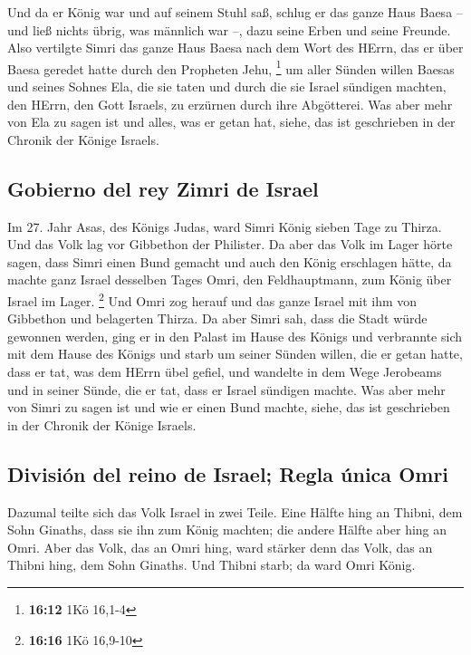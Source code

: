  Und da er König war und auf seinem Stuhl saß, schlug er
das ganze Haus Baesa -- und ließ nichts übrig, was männlich war --, dazu
seine Erben und seine Freunde.  Also vertilgte Simri das
ganze Haus Baesa nach dem Wort des HErrn, das er über Baesa geredet
hatte durch den Propheten Jehu, \footnote{\textbf{16:12} 1Kö 16,1-4}
 um aller Sünden willen Baesas und seines Sohnes Ela, die
sie taten und durch die sie Israel sündigen machten, den HErrn, den Gott
Israels, zu erzürnen durch ihre Abgötterei.  Was aber
mehr von Ela zu sagen ist und alles, was er getan hat, siehe, das ist
geschrieben in der Chronik der Könige Israels.

\hypertarget{gobierno-del-rey-zimri-de-israel}{%
\subsection{Gobierno del rey Zimri de
Israel}\label{gobierno-del-rey-zimri-de-israel}}

 Im 27. Jahr Asas, des Königs Judas, ward Simri König
sieben Tage zu Thirza. Und das Volk lag vor Gibbethon der Philister.
 Da aber das Volk im Lager hörte sagen, dass Simri einen
Bund gemacht und auch den König erschlagen hätte, da machte ganz Israel
desselben Tages Omri, den Feldhauptmann, zum König über Israel im Lager.
\footnote{\textbf{16:16} 1Kö 16,9-10}  Und Omri zog
herauf und das ganze Israel mit ihm von Gibbethon und belagerten Thirza.
 Da aber Simri sah, dass die Stadt würde gewonnen werden,
ging er in den Palast im Hause des Königs und verbrannte sich mit dem
Hause des Königs und starb  um seiner Sünden willen, die
er getan hatte, dass er tat, was dem HErrn übel gefiel, und wandelte in
dem Wege Jerobeams und in seiner Sünde, die er tat, dass er Israel
sündigen machte.  Was aber mehr von Simri zu sagen ist
und wie er einen Bund machte, siehe, das ist geschrieben in der Chronik
der Könige Israels.

\hypertarget{divisiuxf3n-del-reino-de-israel-regla-uxfanica-omri}{%
\subsection{División del reino de Israel; Regla única
Omri}\label{divisiuxf3n-del-reino-de-israel-regla-uxfanica-omri}}

 Dazumal teilte sich das Volk Israel in zwei Teile. Eine
Hälfte hing an Thibni, dem Sohn Ginaths, dass sie ihn zum König machten;
die andere Hälfte aber hing an Omri.  Aber das Volk, das
an Omri hing, ward stärker denn das Volk, das an Thibni hing, dem Sohn
Ginaths. Und Thibni starb; da ward Omri König.

